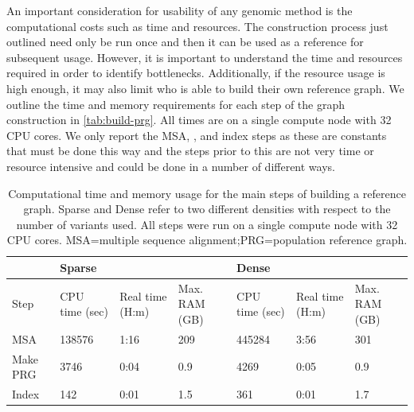 An important consideration for usability of any genomic method is the computational costs such as time and resources. The construction process just outlined need only be run once and then it can be used as a reference for subsequent \pandora{} usage. However, it is important to understand the time and resources required in order to identify bottlenecks. Additionally, if the resource usage is high enough, it may also limit who is able to build their own reference graph. We outline the time and memory requirements for each step of the graph construction in \autoref{tab:build-prg}. All times are on a single compute node with 32 CPU cores. We only report the MSA, \makeprg{}, and \pandora{} index steps as these are constants that must be done this way and the steps prior to this are not very time or resource intensive and could be done in a number of different ways.

\begin{table}
\centering
\begin{tabularx}{\textwidth}{|l|l|l|l|l|l|l|}
\hline
         & \multicolumn{3}{l|}{Sparse}                          & \multicolumn{3}{l|}{Dense}                           \\ \hline
Step     & CPU time (sec) & Real time (H:m) & Max. RAM (GB) & CPU time (sec) & Real time (H:m) & Max. RAM (GB) \\ \hline%
MSA      & 138576         & 1:16             & 209              & 445284         & 3:56             & 301              \\ \hline%
Make PRG & 3746           & 0:04             & 0.9              & 4269           & 0:05             & 0.9              \\ \hline%
Index    & 142            & 0:01             & 1.5              & 361            & 0:01             & 1.7              \\ \hline%
\end{tabularx}
\caption{Computational time and memory usage for the main steps of building a \mtb{} reference graph. Sparse and Dense refer to two different densities with respect to the number of variants used. All steps were run on a single compute node with 32 CPU cores. MSA=multiple sequence alignment;PRG=population reference graph.}
\label{tab:build-prg}
\end{table}


